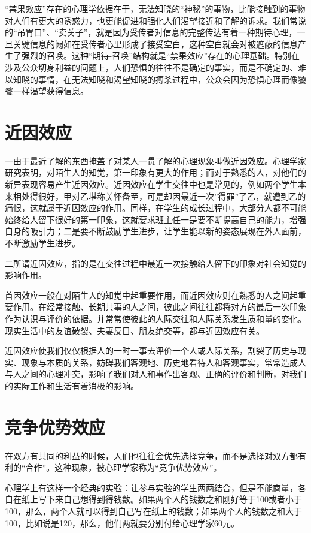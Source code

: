 \documentclass[11pt]{ctexart}
\begin{document}
“禁果效应”存在的心理学依据在于，无法知晓的“神秘”的事物，比能接触到的事物对人们有更大的诱惑力，也更能促进和强化人们渴望接近和了解的诉求。我们常说的“吊胃口”、“卖关子”，就是因为受传者对信息的完整传达有着一种期待心理，一旦关键信息的阙如在受传者心里形成了接受空白，这种空白就会对被遮蔽的信息产生了强烈的召唤。这种“期待-召唤”结构就是“禁果效应”存在的心理基础。特别在涉及公众切身利益的问题上，人们恐惧的往往不是确定的事实，而是不确定的、难以知晓的事情，在无法知晓和渴望知晓的搏杀过程中，公众会因为恐惧心理而像饕餮一样渴望获得信息。
\section{近因效应}
\label{sec-55}


一由于最近了解的东西掩盖了对某人一贯了解的心理现象叫做近因效应。心理学家研究表明，对陌生人的知觉，第一印象有更大的作用；而对于熟悉的人，对他们的新异表现容易产生近因效应。近因效应在学生交往中也是常见的，例如两个学生本来相处得很好，甲对乙堪称关怀备至，可是却因最近一次''得罪''了乙，就遭到乙的痛恨，这就属于近因效应的作用。同样，在学生的成长过程中，大部分人都不可能始终给人留下很好的第一印象，这就要求班主任一是要不断提高自己的能力，增强自身的吸引力；二是要不断鼓励学生进步，让学生能以新的姿态展现在外人面前，不断激励学生进步。

二所谓近因效应，指的是在交往过程中最近一次接触给人留下的印象对社会知觉的影响作用。

首因效应一般在对陌生人的知觉中起重要作用，而近因效应则在熟悉的人之间起重要作用。在经常接触、长期共事的人之间，彼此之间往往都将对方的最后一次印象作为认识与评价的依据。并常常使彼此的人际交往和人际关系发生质和量的变化。现实生活中的友谊破裂、夫妻反目、朋友绝交等，都与近因效应有关。

近因效应使我们仅仅根据人的一时一事去评价一个人或人际关系，割裂了历史与现实、现象与本质的关系，妨碍我们客观地、历史地看待人和客观事实，常常造成人与人之间的心理冲突，影响了我们对人和事作出客观、正确的评价和判断，对我们的实际工作和生活有着消极的影响。
\section{竞争优势效应}
\label{sec-56}


在双方有共同的利益的时候，人们也往往会优先选择竞争，而不是选择对双方都有利的“合作”。这种现象，被心理学家称为“竞争优势效应”。

心理学上有这样一个经典的实验：让参与实验的学生两两结合，但是不能商量，各自在纸上写下来自己想得到得钱数。如果两个人的钱数之和刚好等于100或者小于100，那么，两个人就可以得到自己写在纸上的钱数；如果两个人的钱数之和大于100，比如说是120，那么，他们两就要分别付给心理学家60元。
\end{document}
